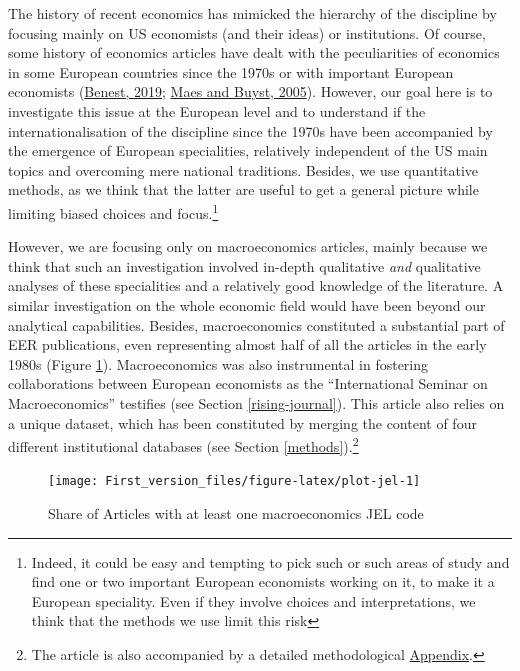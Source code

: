 \documentclass[]{elsarticle} %
\begin{document}
The history of recent economics has mimicked the hierarchy of the
discipline by focusing mainly on US economists (and their ideas) or
institutions. Of course, some history of economics articles have dealt
with the peculiarities of economics in some European countries since the
1970s or with important European economists
(\protect\hyperlink{ref-benest2019}{Benest, 2019};
\protect\hyperlink{ref-maes2005}{Maes and Buyst, 2005}). However, our
goal here is to investigate this issue at the European level and to
understand if the internationalisation of the discipline since the 1970s
have been accompanied by the emergence of European specialities,
relatively independent of the US main topics and overcoming mere
national traditions. Besides, we use quantitative methods, as we think
that the latter are useful to get a general picture while limiting
biased choices and focus.\footnote{Indeed, it could be easy and tempting
  to pick such or such areas of study and find one or two important
  European economists working on it, to make it a European speciality.
  Even if they involve choices and interpretations, we think that the
  methods we use limit this risk}

However, we are focusing only on macroeconomics articles, mainly because
we think that such an investigation involved in-depth qualitative
\emph{and} qualitative analyses of these specialities and a relatively
good knowledge of the literature. A similar investigation on the whole
economic field would have been beyond our analytical capabilities.
Besides, macroeconomics constituted a substantial part of EER
publications, even representing almost half of all the articles in the
early 1980s (Figure \ref{fig:plot-jel}). Macroeconomics was also
instrumental in fostering collaborations between European economists as
the ``International Seminar on Macroeconomics'' testifies (see Section
\ref{rising-journal}). This article also relies on a unique dataset,
which has been constituted by merging the content of four different
institutional databases (see Section \ref{methods}).\footnote{The
  article is also accompanied by a detailed methodological
  \protect\hyperlink{appendix}{Appendix}.}

\begin{figure}[h]

{\centering \texttt{[image: First\_version\_files/figure-latex/plot-jel-1]} 

}

\caption{Share of Articles with at least one macroeconomics JEL code}\label{fig:plot-jel}
\end{figure}
\end{document}

